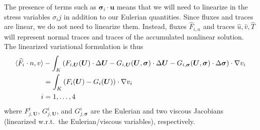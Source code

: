 The presence of terms such as $\boldsymbol \sigma_i \cdot \boldsymbol u$ means that we will need to linearize in the stress variables $\sigma_ij$ in addition to our Eulerian quantities. Since fluxes and traces are linear, we do not need to linearize them. Instead, fluxes $\widehat{F}_{i,n}$ and traces $\widehat{u},\widehat{v},\widehat{T}$ will represent normal traces and traces of the accumulated nonlinear solution. The linearized variational formulation is thus
\begin{align*}
\langle \widehat{F}_i\cdot n, v\rangle &- \int_K  \left(F_{i,\boldsymbol U}(\boldsymbol U)\cdot \Delta \boldsymbol U -G_{i,\boldsymbol U}(\boldsymbol U, \boldsymbol \sigma)\cdot \Delta \boldsymbol U - G_{i,\boldsymbol \sigma}(\boldsymbol U, \boldsymbol \sigma)\cdot \Delta \boldsymbol \sigma \right)\cdot \grad v_i \\
&= \int_K  \left(F_i(\boldsymbol U)-G_i(\boldsymbol U)\right) \cdot \grad v_i \\
\qquad i &= 1,\ldots, 4
\end{align*}
where $F^i_{j,\boldsymbol U}$, $G^i_{j,\boldsymbol U}$, and $G^i_{j,\boldsymbol \sigma}$ are the Eulerian and two viscous Jacobians (linearized w.r.t.\ the Eulerian/viscous variables), respectively.
